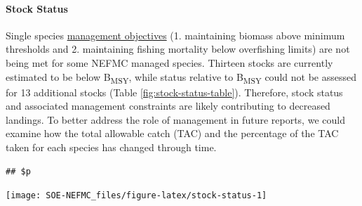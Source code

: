 \documentclass[
  10pt,
]{article}
\let\origfigure\figure
\let\endorigfigure\endfigure
\renewenvironment{figure}[1][2] {
    \expandafter\origfigure\expandafter[H]
} {
    \endorigfigure
}
\begin{document}
\hypertarget{stock-status}{%
\paragraph{Stock Status}\label{stock-status}}

Single species \href{https://noaa-edab.github.io/catalog/stock-status.html}{management objectives} (1. maintaining biomass above minimum thresholds and 2. maintaining fishing mortality below overfishing limits) are not being met for some NEFMC managed species. Thirteen stocks are currently estimated to be below B\textsubscript{MSY}, while status relative to B\textsubscript{MSY} could not be assessed for 13 additional stocks (Table \ref{fig:stock-status-table}). Therefore, stock status and associated management constraints are likely contributing to decreased landings. To better address the role of management in future reports, we could examine how the total allowable catch (TAC) and the percentage of the TAC taken for each species has changed through time.

\begin{verbatim}
## $p
\end{verbatim}

\begin{figure}

{\centering \texttt{[image: SOE-NEFMC\_files/figure-latex/stock-status-1]} 

}

\caption{Summary of single species status for NEFMC and jointly federally managed stocks (goosefish and spiny dogfish).  The dotted vertical line at one is the target biomass reference point of B.  The dashed lines are the management thresholds of B (vertical) or F (horizontal). Colors denote stocks with B/B\textsubscript{MSY} < 0.5 or F/F\textsubscript{MSY} (orange), stocks 0.5<B/B\textsubscript{MSY}<1 (blue), and stocks B/B\textsubscript{MSY}>1 (green).CCGOM = Cape Cod Gulf of Maine, GOM = Gulf of Maine, GB = Georges Bank, SNEMA = Southern New England Mid Atlantic}\label{fig:stock-status}
\end{figure}
\end{document}
